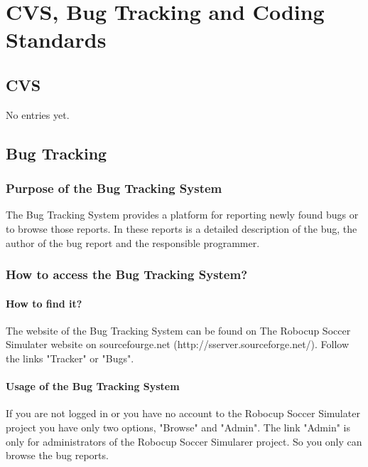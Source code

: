 
\chapter{CVS, Bug Tracking and Coding Standards}


\section{CVS}

No entries yet.

\section{Bug Tracking}

\subsection{Purpose of the Bug Tracking System}

The Bug Tracking System provides a platform for reporting newly found bugs or to
browse those reports. In these reports is a detailed description of the bug, the author of the bug report and the responsible programmer.

\subsection{How to access the Bug Tracking System?}

\subsubsection{How to find it?}

The website of the Bug Tracking System can be found on The Robocup Soccer Simulater website on sourcefourge.net (http://sserver.sourceforge.net/). Follow the links "Tracker" or "Bugs".

\subsubsection{Usage of the Bug Tracking System}

If you are not logged in or you have no account to the Robocup Soccer Simulater project
you have only two options, "Browse" and "Admin". The link "Admin" is only for administrators of the
Robocup Soccer Simularer project. So you only can browse the bug reports.

